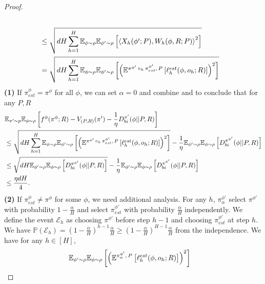 \begin{proof}
\begin{align}
    \\&\le \sqrt{ dH\sum_{h=1}^H \mathbb{E}_{\phi \sim \rho}\mathbb{E}_{\phi' \sim \rho} \left[\left\langle X_h(\phi';P) , W_h(\phi, R; P)\right\rangle^2\right]} \nonumber
    \\&= \sqrt{dH \sum_{h=1}^H \mathbb{E}_{\phi \sim \rho}\mathbb{E}_{\phi' \sim \rho}\left[\left( \mathbb{E}^{\pi^{\phi'}\,\circ_h \, \pi^{\phi'}_{est} , \,P}\left[\ell^{est}_h(\phi, o_h; R)\right]\right)^2\right]} 
    \label{eq:bilinear est}
\end{align}
\textbf{(1)} If $\pi^\phi_{est} = \pi^\phi$ for all $\phi$, we can set $\alpha = 0$ and combine  and  to conclude that for any $P,R$
\begin{align*}
    &\mathbb{E}_{\pi' \sim p}\mathbb{E}_{\phi \sim \rho}\left[f^{\phi}(\pi^{\phi}; R) - V_{(P,R)}(\pi') - \frac{1}{\eta} D_{bi}^{\pi'}(\phi||P, R)\right] \\
    &\leq \sqrt{dH \sum_{h=1}^H \mathbb{E}_{\phi \sim \rho}\mathbb{E}_{\phi' \sim \rho}\left[\left( \mathbb{E}^{\pi^{\phi'}\,\circ_h \, \pi^{\phi'}_{est} , \,P}\left[\ell^{est}_h(\phi, o_h; R)\right]\right)^2\right]}  - \frac{1}{\eta} \mathbb{E}_{\phi' \sim \rho}\mathbb{E}_{\phi \sim \rho}\left[D_{bi}^{\pi^{\phi'}}(\phi||P, R)\right] \\
    &\leq \sqrt{dH \mathbb{E}_{\phi' \sim \rho}\mathbb{E}_{\phi \sim \rho}\left[D_{bi}^{\pi^{\phi'}}(\phi||P, R)\right]}  - \frac{1}{\eta} \mathbb{E}_{\phi' \sim \rho}\mathbb{E}_{\phi \sim \rho}\left[D_{bi}^{\pi^{\phi'}}(\phi||P, R)\right] \\
    &\leq \frac{\eta dH}{4}. 
\end{align*}
\textbf{(2)} If $\pi^\phi_{est} \neq \pi^\phi$ for some $\phi$, we need additional analysis. For any $h$,  $\pi_{\alpha}^{\phi'}$ select $\pi^{\phi'}$ with probability $1-\frac{\alpha}{H}$ and  select $\pi_{est}^{\phi'}$ with probability $\frac{\alpha}{H}$ independently. We define the event $\mathcal{E}_h$ as choosing $\pi^{\phi'}$ before step $h-1$ and choosing $\pi^{\phi'}_{est}$ at step $h$. We have $\mathbb{P}\left(\mathcal{E}_h\right) = \left(1-\frac{\alpha}{H}\right)^{h-1}\frac{\alpha}{H} \ge  \left(1-\frac{\alpha}{H}\right)^{H-1}\frac{\alpha}{H}$ from the independence. We have for any $h\in[H]$, 
\begin{align*}
    &\E_{\phi' \sim \rho}\E_{\phi \sim \rho}\left[\left(\E^{\pi_{\alpha}^{\phi'}, \,P}\left[\ellest_h(\phi, o_h; R)\right]\right)^2\right]

\end{align*}
\end{proof}
